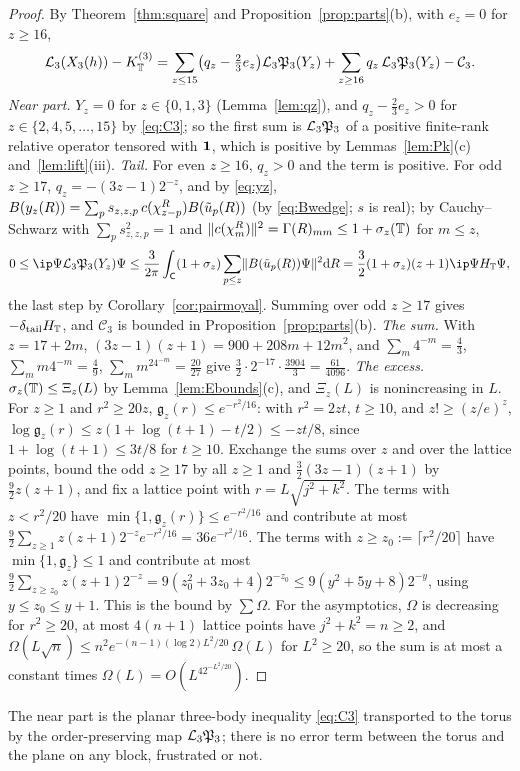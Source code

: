 \begin{proof}
By Theorem~\ref{thm:square} and Proposition~\ref{prop:parts}(b), with $e_z=0$ for $z\ge16$,
\[
\mathcal{L}_3(X_3(h))-K_{\mathbb{T}}^{(3)}=\sum_{z\le15}\bigl(q_z-\tfrac23e_z\bigr)\mathcal{L}_3\mathfrak{P}_3(Y_z)+\sum_{z\ge16}q_z\,\mathcal{L}_3\mathfrak{P}_3(Y_z)-\mathcal C_3 .
\]
\emph{Near part.} $Y_z=0$ for $z\in\{0,1,3\}$ (Lemma~\ref{lem:qz}), and $q_z-\frac23e_z>0$ for $z\in\{2,4,5,\dots,15\}$ by \eqref{eq:C3}; so
the first sum is $\mathcal{L}_3\mathfrak{P}_3$ of a positive finite-rank relative operator tensored with $\mathbf{1}$, which is positive by
Lemmas~\ref{lem:Pk}(c) and~\ref{lem:lift}(iii). \emph{Tail.} For even $z\ge16$, $q_z>0$ and the term is positive. For odd $z\ge17$,
$q_z=-(3z-1)2^{-z}$, and by \eqref{eq:yz}, $B(y_z(R))=\sum_ps_{z,z,p}\,c(\chi^R_{z-p})B(\tilde u_p(R))$ (by \eqref{eq:Bwedge}; $s$ is real); by
Cauchy--Schwarz with $\sum_ps_{z,z,p}^2=1$ and $\lVert c(\chi_m^R)\rVert^2=\Gamma(R)_{mm}\le1+\sigma_z(\mathbb{T})$ for $m\le z$,
\[
0\le\ip\Psi{\LL_3\Pp_3(Y_z)\Psi}\le\frac3{2\pi}\int_\cell(1+\sigma_z)\sum_{p\le z}\norm{B(\ut_p(R))\Psi}^2\dd R=\frac32(1+\sigma_z)(z+1)\ip\Psi{\HT\Psi},
\]
the last step by Corollary~\ref{cor:pairmoyal}. Summing over odd $z\ge17$ gives $-\delta_{\mathrm{tail}}H_{\mathbb{T}}$, and $\mathcal C_3$ is bounded in
Proposition~\ref{prop:parts}(b). \emph{The sum.} With $z=17+2m$, $(3z-1)(z+1)=900+208m+12m^2$, and $\sum_m4^{-m}=\frac43$,
$\sum_mm4^{-m}=\frac49$, $\sum_mm^24^{-m}=\frac{20}{27}$ give $\frac32\cdot2^{-17}\cdot\frac{3904}3=\frac{61}{4096}$. \emph{The excess.}
$\sigma_z(\mathbb{T})\le\Xi_z(L)$ by Lemma~\ref{lem:Ebounds}(c), and $\Xi_z(L)$ is nonincreasing in $L$. For $z\ge1$ and $r^2\ge20z$,
$\mathfrak g_z(r)\le e^{-r^2/16}$: with $r^2=2zt$, $t\ge10$, and $z!\ge(z/e)^z$, $\log\mathfrak g_z(r)\le z(1+\log(t+1)-t/2)\le-zt/8$, since
$1+\log(t+1)\le3t/8$ for $t\ge10$. Exchange the sums over $z$ and over the lattice points, bound the odd $z\ge17$ by all $z\ge1$
and $\frac32(3z-1)(z+1)$ by $\frac92z(z+1)$, and fix a lattice point with $r=L\sqrt{j^2+k^2}$. The terms with $z<r^2/20$ have
$\min\{1,\mathfrak g_z(r)\}\le e^{-r^2/16}$ and contribute at most $\frac92\sum_{z\ge1}z(z+1)2^{-z}e^{-r^2/16}=36e^{-r^2/16}$. The terms
with $z\ge z_0:=\lceil r^2/20\rceil$ have $\min\{1,\mathfrak g_z\}\le1$ and contribute at most
$\frac92\sum_{z\ge z_0}z(z+1)2^{-z}=9(z_0^2+3z_0+4)2^{-z_0}\le9(y^2+5y+8)2^{-y}$, using $y\le z_0\le y+1$. This is the bound by
$\sum\Omega$. For the asymptotics, $\Omega$ is decreasing for $r^2\ge20$, at most $4(n+1)$ lattice points have $j^2+k^2=n\ge2$, and
$\Omega(L\sqrt n)\le n^2e^{-(n-1)(\log2)L^2/20}\,\Omega(L)$ for $L^2\ge20$, so the sum is at most a constant times $\Omega(L)=O(L^42^{-L^2/20})$.
\end{proof}

The near part is the planar three-body inequality \eqref{eq:C3} transported to the torus by the order-preserving map
$\mathcal{L}_3\mathfrak{P}_3$; there is no error term between the torus and the plane on any block, frustrated or not.
